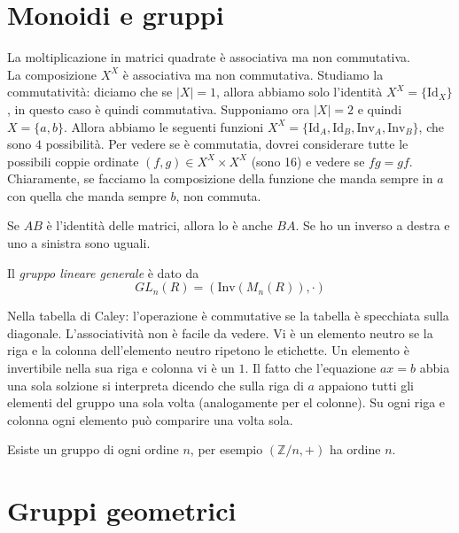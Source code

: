 \documentclass[a4paper]{article}
\begin{document}
\section{Monoidi e gruppi} %

La moltiplicazione in matrici quadrate è associativa ma non commutativa.
\\
La composizione \(X^X\) è associativa ma non commutativa.
Studiamo la commutatività:
diciamo che se \(|X| = 1\), allora abbiamo solo l'identità \(X^X = \{\text{Id}_X\}\),
in questo caso è quindi commutativa.
Supponiamo ora \(|X| = 2\) e quindi \(X = \{a,b\}\). Allora abbiamo le seguenti funzioni \(X^X = \{\text{Id}_A, \text{Id}_B, \text{Inv}_A, \text{Inv}_B\}\),
che sono \(4\) possibilità.
Per vedere se è commutatia, dovrei considerare
tutte le possibili coppie ordinate \((f,g) \in X^X \times X^X\)
(sono 16) e vedere se \(fg = gf\). Chiaramente, se facciamo la composizione della funzione che manda
sempre in \(a\) con quella che manda sempre \(b\), non commuta.

Se \(AB\) è l'identità delle matrici, allora lo è anche \(BA\).
Se ho un inverso a destra e uno a sinistra sono uguali.

Il \textit{gruppo lineare generale} è dato da
\[
    GL_n(R) = (\text{Inv}(M_n(R)), \cdot)
\]

Nella tabella di Caley: l'operazione è commutative se la tabella
è specchiata sulla diagonale. L'associatività non è facile da vedere.
Vi è un elemento neutro se la riga e la colonna dell'elemento neutro ripetono le etichette.
Un elemento è invertibile nella sua riga e colonna vi è un \(1\).
Il fatto che l'equazione \(ax = b\)
abbia una sola solzione si interpreta dicendo che sulla riga
di \(a\) appaiono tutti gli elementi del gruppo una sola volta
(analogamente per el colonne).
Su ogni riga e colonna ogni elemento può comparire una volta sola.


Esiste un gruppo di ogni ordine \(n\), per esempio \((\mathbb{Z} / n, +)\) ha ordine \(n\).

\pagebreak

\section{Gruppi geometrici}

\end{document}
